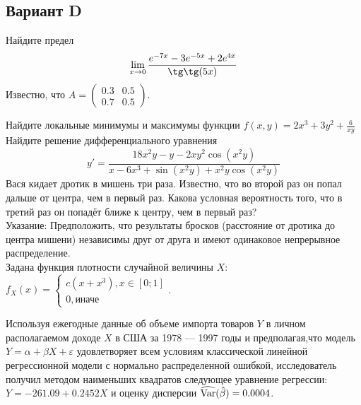 \documentclass[addpoints, answers]{exam} %
\begin{document}
\subsection{Вариант D}
\begin{questions}
\question Найдите предел
\[
\lim_{x\to 0} \frac{e^{-7x}-3e^{-5x}+2e^{4x}}{\tg\tg(5x)}
\]
\question Известно, что $A=
\left(\begin{array}{cc}
0.3 & 0.5\\
0.7 & 0.5
\end{array}\right)$.
\question Найдите локальные минимумы и максимумы функции $f(x,y)=2x^3+3y^2+\frac{6}{xy}$\\
\question Найдите решение дифференциального уравнения
\[
y'=\frac{18x^2y-y-2xy^2\cos (x^2y)}{x-6x^3+\sin(x^2y)+x^2y\cos(x^2 y)}
\]
\question Вася кидает дротик в мишень три раза. Известно, что во второй раз он попал дальше от центра, чем в первый раз. Какова условная вероятность того, что в третий раз он попадёт ближе к центру, чем в первый раз?\\
Указание: Предположить, что результаты бросков (расстояние от дротика до центра мишени) независимы друг от друга и имеют одинаковое непрерывное распределение.\\
\question Задана функция плотности случайной величины $X$:\\
$f_X(x)=\begin{cases}
c(x+x^3), x \in [0;1] \\
0, \text{иначе}
\end{cases}$.
\question Используя ежегодные данные об объеме импорта товаров $Y$ в личном располагаемом доходе $X$ в США за 1978 --- 1997 годы и предполагая,что модель $Y=\alpha+\beta X+\varepsilon$ удовлетворяет всем условиям классической линейной регрессионной модели с нормально распределенной ошибкой, исследователь получил методом наименьших квадратов следующее уравнение регрессии: $Y=-261.09+0.2452X$ и оценку дисперсии $\widehat{\operatorname{Var}}(\hat{\beta})=0.0004$.
\begin{parts}

\end{parts}
\end{questions}
\end{document}
